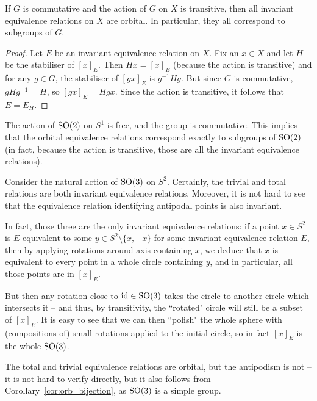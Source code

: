 	\begin{prop}
		\label{prop:comm+trans}
		If $G$ is commutative and the action of $G$ on $X$ is transitive, then all invariant equivalence relations on $X$ are orbital. In particular, they all correspond to subgroups of $G$.
	\end{prop}
	\begin{proof}
		Let $E$ be an invariant equivalence relation on $X$. Fix an $x\in X$ and let $H$ be the stabiliser of $[x]_E$. Then $Hx=[x]_E$ (because the action is transitive) and for any $g\in G$, the stabiliser of $[gx]_E$ is $g^{-1}Hg$. But since $G$ is commutative, $gHg^{-1}=H$, so $[gx]_E=Hgx$. Since the action is transitive, it follows that $E=E_H$.
	\end{proof}
	
	\begin{ex}
		The action of $\operatorname{{SO}}(2)$ on $S^1$ is free, and the group is commutative. This implies that the orbital equivalence relations correspond exactly to subgroups of $\operatorname{{SO}}(2)$ (in fact, because the action is transitive, those are all the invariant equivalence relations).\xqed{\lozenge}
	\end{ex}
	
	\begin{ex}
		\label{ex:3drotations}
		Consider the natural action of $\operatorname{{SO}}(3)$ on $S^2$. Certainly, the trivial and total relations are both invariant equivalence relations. Moreover, it is not hard to see that the equivalence relation identifying antipodal points is also invariant.
		
		In fact, those three are the only invariant equivalence relations: if a point $x\in S^2$ is $E$-equivalent to some $y\in S^2\setminus \{x,-x\}$ for some invariant equivalence relation $E$, then by applying rotations around axis containing $x$, we deduce that $x$ is equivalent to every point in a whole circle containing $y$, and in particular, all those points are in $[x]_E$.
		
		But then any rotation close to $\operatorname{{id}}\in \operatorname{{SO}}(3)$ takes the circle to another circle which intersects it -- and thus, by transitivity, the ``rotated" circle will still be a subset of $[x]_E$. It is easy to see that we can then ``polish" the whole sphere with (compositions of) small rotations applied to the initial circle, so in fact $[x]_E$ is the whole $\operatorname{{SO}}(3)$.
		
		The total and trivial equivalence relations are orbital, but the antipodism is not -- it is not hard to verify directly, but it also follows from Corollary~\ref{cor:orb_bijection}, as $\operatorname{{SO}}(3)$ is a simple group.\xqed{\lozenge}
	\end{ex}
	
